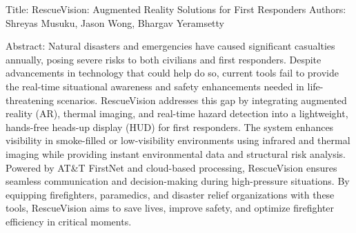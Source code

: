 ﻿Title: RescueVision: Augmented Reality Solutions for First Responders
Authors: Shreyas Musuku, Jason Wong, Bhargav Yeramsetty


Abstract:
Natural disasters and emergencies have caused significant casualties annually, posing severe risks to both civilians and first responders. Despite advancements in technology that could help do so, current tools fail to provide the real-time situational awareness and safety enhancements needed in life-threatening scenarios. RescueVision addresses this gap by integrating augmented reality (AR), thermal imaging, and real-time hazard detection into a lightweight, hands-free heads-up display (HUD) for first responders.
The system enhances visibility in smoke-filled or low-visibility environments using infrared and thermal imaging while providing instant environmental data and structural risk analysis. Powered by AT&T FirstNet and cloud-based processing, RescueVision ensures seamless communication and decision-making during high-pressure situations. By equipping firefighters, paramedics, and disaster relief organizations with these tools, RescueVision aims to save lives, improve safety, and optimize firefighter efficiency in critical moments.